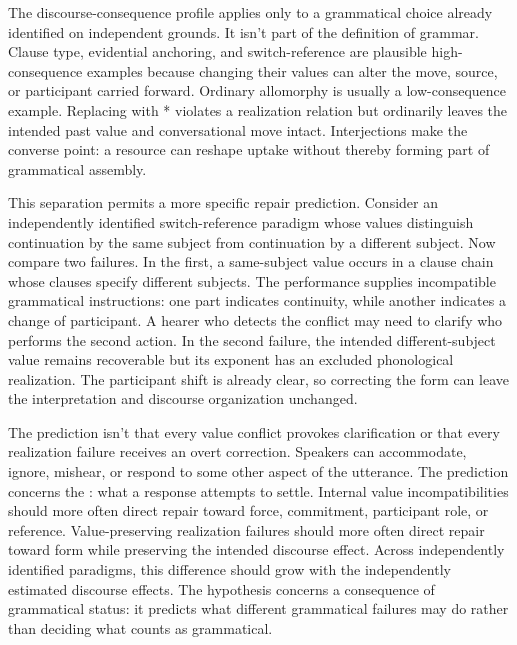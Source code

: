 \documentclass[12pt,letterpaper]{article}
\begin{document}
The discourse-consequence profile applies only to a grammatical choice already
identified on independent grounds. It isn't part of the definition of grammar.
Clause type, evidential anchoring, and switch-reference are plausible
high-consequence examples because changing their values can alter the move, source,
or participant carried forward. Ordinary allomorphy is usually a low-consequence
example. Replacing  with * violates a realization
relation but ordinarily leaves the intended past value and conversational move
intact. Interjections make the converse point: a resource can reshape uptake
without thereby forming part of grammatical assembly.

This separation permits a more specific repair prediction. Consider an
independently identified switch-reference paradigm whose values distinguish
continuation by the same subject from continuation by a different subject. Now
compare two failures. In the first, a same-subject value occurs in a clause chain
whose clauses specify different subjects. The performance supplies
incompatible grammatical instructions: one part indicates continuity, while
another indicates a change of participant. A hearer who detects the conflict may
need to clarify who performs the second action. In the second failure, the intended
different-subject value remains recoverable but its exponent has an excluded
phonological realization. The participant shift is already clear, so correcting
the form can leave the interpretation and discourse organization unchanged.

The prediction isn't that every value conflict provokes clarification or that
every realization failure receives an overt correction. Speakers can accommodate,
ignore, mishear, or respond to some other aspect of the utterance. The prediction
concerns the : what a response attempts to settle. Internal
value incompatibilities should more often direct repair toward force, commitment,
participant role, or reference. Value-preserving realization failures should more
often direct repair toward form while preserving the intended discourse effect.
Across independently identified paradigms, this difference should grow with the
independently estimated discourse effects. The hypothesis concerns a consequence
of grammatical status: it predicts what different grammatical failures may do
rather than deciding what counts as grammatical.
\end{document}
